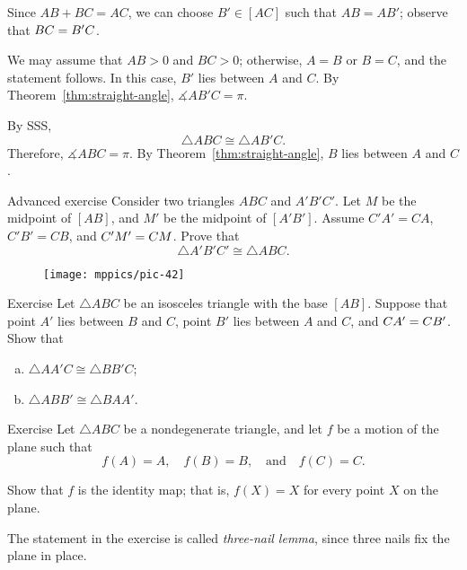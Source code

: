 Since $AB+BC=AC$, we can choose $B'\in [AC]$ such that $AB=AB'$;
observe that $BC=B'C$.

We may assume that $AB>0$ and $BC>0$;
otherwise, $A=B$ or $B=C$, and the statement follows.
In this case, $B'$ lies between $A$ and $C$.
By Theorem~\ref{thm:straight-angle}, $\measuredangle AB'C=\pi$.

By SSS, 
\[\triangle ABC\cong \triangle AB'C.\]
Therefore, $\measuredangle ABC=\pi$.
By Theorem~\ref{thm:straight-angle}, $B$ lies between $A$ and $C$.
\qeds



\begin{thm}{Advanced exercise}\label{ex:SMS}
Consider two triangles $A B C$ and $A' B' C'$.
Let $M$ be the midpoint of $[A B]$, and
$M'$ be the midpoint of $[A' B']$.
Assume $C' A'=C A$, $C' B'= C B$, and $C' M'= C M$.
Prove that
\[\triangle A' B' C'\cong\triangle A B C.\]

\end{thm}

{

\begin{wrapfigure}[6]{r}{26mm}
\vskip-0mm
\centering
\texttt{[image: mppics/pic-42]}
\end{wrapfigure}

\begin{thm}{Exercise}\label{ex:isos-sides}
Let $\triangle A B C$ be an isosceles triangle with the base $[A B]$.
Suppose that point $A'$ lies between $B$ and $C$,
point $B'$ lies between $A$ and $C$,
and $C A'=C B'$.
Show that
\begin{enumerate}[(a)]
\item $\triangle A A' C\cong \triangle B B' C$;
\item $\triangle A B B'\cong \triangle B A A'$.
\end{enumerate}

\end{thm}

\begin{thm}[!]{Exercise}\label{ex:ABC-motion}
Let $\triangle ABC$ be a nondegenerate triangle, and
let $f$ be a motion of the plane 
such that 
$$f(A)=A,
\quad 
f(B)=B,
\quad 
\text{and}
\quad
f(C)=C.$$

Show that $f$ is the identity map;
that is, $f(X)=X$ for every point $X$ on the plane.
\end{thm}

The statement in the exercise is called  \emph{three-nail lemma}, since three nails fix the plane in place. %

}

